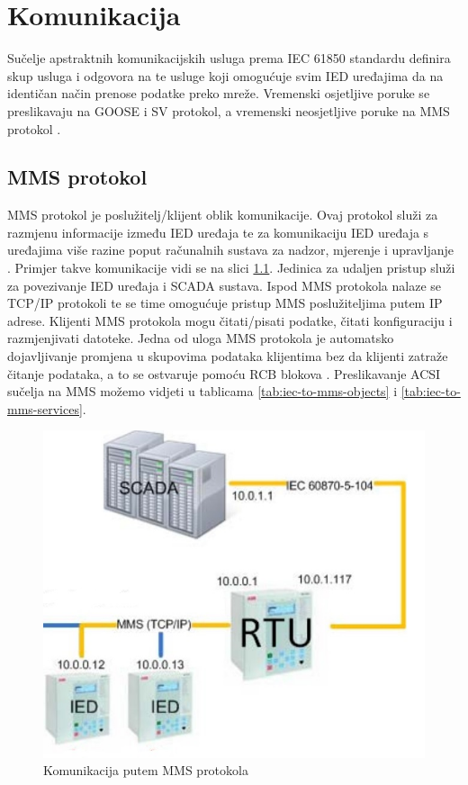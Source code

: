 \documentclass[times, utf8, zavrsni]{fer}
\begin{document}
\chapter{Komunikacija}
Sučelje apstraktnih komunikacijskih usluga  prema IEC 61850 standardu definira skup usluga i odgovora na te usluge koji omogućuje svim IED uređajima da na identičan način prenose podatke preko mreže. Vremenski osjetljive poruke se preslikavaju na GOOSE i SV protokol, a vremenski neosjetljive poruke na MMS protokol \citep{baigent2004iec}.

\section{MMS protokol}
MMS protokol  je poslužitelj/kli\-jent oblik komunikacije. Ovaj protokol služi za razmjenu informacije između IED uređaja te za komunikaciju IED uređaja s uređajima više razine poput računalnih sustava za nadzor, mjerenje i upravljanje . Primjer takve komunikacije vidi se na slici \ref{fig:iec-mms}. Jedinica za udaljen pristup  služi za povezivanje IED uređaja i SCADA sustava. Ispod MMS protokola nalaze se TCP/IP protokoli te se time omogućuje pristup MMS poslužiteljima putem IP adrese. Klijenti MMS protokola mogu čitati/pisati podatke, čitati konfiguraciju i razmjenjivati datoteke. Jedna od uloga MMS protokola je automatsko dojavljivanje promjena u skupovima podataka klijentima bez da klijenti zatraže čitanje podataka, a to se ostvaruje pomoću RCB blokova \citep{typhoon:MMS}. Preslikavanje ACSI sučelja na MMS možemo vidjeti u tablicama \ref{tab:iec-to-mms-objects} i \ref{tab:iec-to-mms-services}.

\begin{figure}[tph]
    \centering
    \includegraphics[scale=0.6]{img/IEC61850-MMS.jpg}
    \caption{Komunikacija putem MMS protokola\footnotemark}
    \label{fig:iec-mms}
\end{figure}
\end{document}

